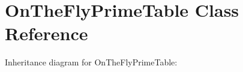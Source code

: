 \hypertarget{classOnTheFlyPrimeTable}{}\section{On\+The\+Fly\+Prime\+Table Class Reference}
\label{classOnTheFlyPrimeTable}


Inheritance diagram for On\+The\+Fly\+Prime\+Table\+:
